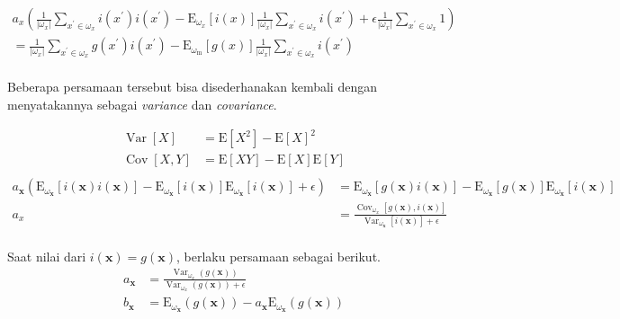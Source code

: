 \documentclass[11pt, a4paper, final]{report}
\begin{document}
$$
\begin{aligned}
a_{x}\left(\frac{1}{\left|\omega_{x}\right|} \sum_{x^{\prime} \in \omega_{x}} i\left(x^{\prime}\right) i\left(x^{\prime}\right)-\mathrm{E}_{\omega_{x}}[i(x)] \frac{1}{\left|\omega_{x}\right|} \sum_{x^{\prime} \in \omega_{x}} i\left(x^{\prime}\right)+\epsilon \frac{1}{\left|\omega_{x}\right|} \sum_{x^{\prime} \in \omega_{x}} 1\right) \\
=\frac{1}{\left|\omega_{x}\right|} \sum_{x^{\prime} \in \omega_{x}} g\left(x^{\prime}\right) i\left(x^{\prime}\right)-\mathrm{E}_{\omega_{\mathrm{m}}}[g(x)] \frac{1}{\left|\omega_{x}\right|} \sum_{x^{\prime} \in \omega_{x}} i\left(x^{\prime}\right) \\
\end{aligned}
$$

Beberapa persamaan tersebut bisa disederhanakan kembali dengan menyatakannya sebagai \textit{variance} dan \textit{covariance}.

$$
\begin{aligned}
\operatorname{Var}[X]&=\mathrm{E}\left[X^{2}\right]-\mathrm{E}[X]^{2} \\
\operatorname{Cov}[X, Y]&=\mathrm{E}[X Y]-\mathrm{E}[X] \mathrm{E}[Y] \\
\end{aligned}
$$
$$
\begin{aligned}
a_{\boldsymbol{x}}\left(\mathrm{E}_{\omega_{\boldsymbol{x}}}[i(\boldsymbol{x}) i(\boldsymbol{x})]-\mathrm{E}_{\omega_{\boldsymbol{x}}}[i(\boldsymbol{x})] \mathrm{E}_{\omega_{\boldsymbol{x}}}[i(\boldsymbol{x})]+\epsilon\right)&= \mathrm{E}_{\omega_{\boldsymbol{x}}}[g(\boldsymbol{x}) i(\boldsymbol{x})]-\mathrm{E}_{\omega_{\boldsymbol{x}}}[g(\boldsymbol{x})] \mathrm{E}_{\omega_{\boldsymbol{x}}}[i(\boldsymbol{x})] \\
a_{x}&=\frac{\operatorname{Cov}_{\omega_{x}}[g(\boldsymbol{x}), i(\boldsymbol{x})]}{\operatorname{Var}_{\omega_{\boldsymbol{x}}}[i(\boldsymbol{x})]+\epsilon} \\
\end{aligned}
$$

Saat nilai dari $i(\bm{x}) = g(\bm{x})$, berlaku persamaan sebagai berikut.
$$
\begin{aligned}
a_{\boldsymbol{x}}&=\frac{\operatorname{Var}_{\omega_{x}}(g(\boldsymbol{x}))}{\operatorname{Var}_{\omega_{x}}(g(\boldsymbol{x}))+\epsilon}\\
b_{\boldsymbol{x}}&=\mathrm{E}_{\omega_{\boldsymbol{x}}}(g(\boldsymbol{x}))-a_{\boldsymbol{x}} \mathrm{E}_{\omega_{\boldsymbol{x}}}(g(\boldsymbol{x}))
\end{aligned}
$$
\end{document}
